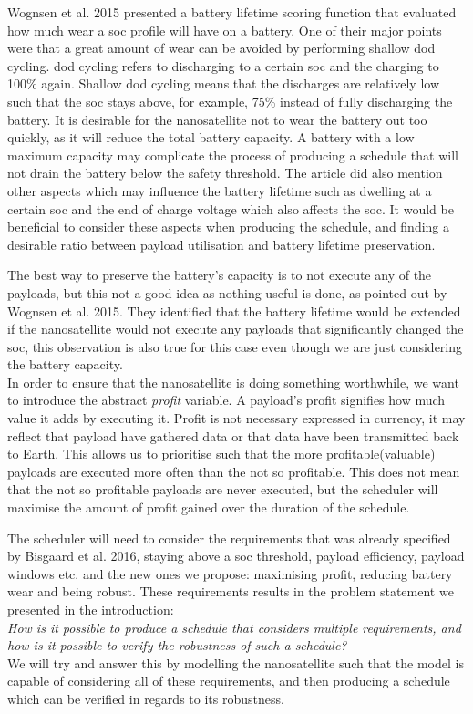 Wognsen et al. 2015\cite{score_function} presented a battery lifetime scoring function that evaluated how much wear a \gls{soc} profile will have on a battery.
One of their major points were that a great amount of wear can be avoided by performing shallow \gls{dod} cycling.
\gls{dod} cycling refers to discharging to a certain \gls{soc} and the charging to 100\% again.
Shallow \gls{dod} cycling means that the discharges are relatively low such that the \gls{soc} stays above, for example, 75\% instead of fully discharging the battery.
It is desirable for the nanosatellite not to wear the battery out too quickly, as it will reduce the total battery capacity.
A battery with a low maximum capacity may complicate the process of producing a schedule that will not drain the battery below the safety threshold.
The article did also mention other aspects which may influence the battery lifetime such as dwelling at a certain \gls{soc} and the end of charge voltage which also affects the \gls{soc}.
It would be beneficial to consider these aspects when producing the schedule, and finding a desirable ratio between payload utilisation and battery lifetime preservation.

The best way to preserve the battery's capacity is to not execute any of the payloads, but this not a good idea as nothing useful is done, as pointed out by Wognsen et al. 2015\cite{score_function}. 
They identified that the battery lifetime would be extended if the nanosatellite would not execute any payloads that significantly changed the \gls{soc}, this observation is also true for this case even though we are just considering the battery capacity.\\
In order to ensure that the nanosatellite is doing something worthwhile, we want to introduce the abstract \textit{profit} variable. 
A payload's profit signifies how much value it adds by executing it. 
Profit is not necessary expressed in currency, it may reflect that payload have gathered data or that data have been transmitted back to Earth. 
This allows us to prioritise such that the more profitable(valuable) payloads are executed more often than the not so profitable.
This does not mean that the not so profitable payloads are never executed, but the scheduler will maximise the amount of profit gained over the duration of the schedule.

The scheduler will need to consider the requirements that was already specified by Bisgaard et al. 2016\cite{gomx3}, staying above a \gls{soc} threshold, payload efficiency, payload windows etc. and the new ones we propose: maximising profit, reducing battery wear and being robust. 
These requirements results in the problem statement we presented in the introduction:\\
\textit{How is it possible to produce a schedule that considers multiple requirements, and how is it possible to verify the robustness of such a schedule?}\\
We will try and answer this by modelling the nanosatellite such that the model is capable of considering all of these requirements, and then producing a schedule which can be verified in regards to its robustness.
